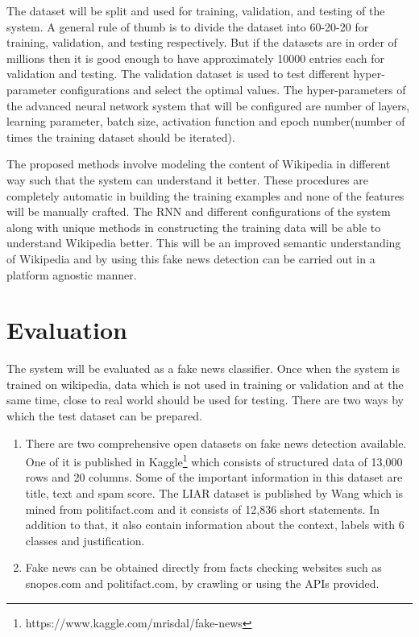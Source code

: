 \documentclass[a4paper, 11pt]{article}
\begin{document}
The dataset will be split and used for training, validation, and testing of the system. A general rule of thumb is to divide the dataset into 60-20-20 for training, validation, and testing respectively. But if the datasets are in order of millions then it is good enough to have approximately 10000 entries each for validation and testing. The validation dataset is used to test different hyper-parameter configurations and select the optimal values. The hyper-parameters of the advanced neural network system that will be configured are number of layers, learning parameter, batch size, activation function and epoch number(number of times the training dataset should be iterated).


The proposed methods involve modeling the content of Wikipedia in different way such  that the system can understand it better. These procedures are completely automatic in building the training examples and none of the features will be manually crafted. The RNN and different configurations of the system along with unique methods in constructing the training data will be able to understand Wikipedia better. This will be an improved semantic understanding of Wikipedia and by using this fake news detection can be carried out in a platform agnostic manner. 

\section{Evaluation}

The system will be evaluated as a fake news classifier. Once when the system is trained on wikipedia, data which is not used in training or validation and at the same time, close to real world should be used for testing. There are two ways by which the test dataset can be prepared.
\begin{enumerate}
\item There are two comprehensive open datasets on fake news detection available. One of it is published in Kaggle\footnote{https://www.kaggle.com/mrisdal/fake-news} which consists of structured data of 13,000 rows and 20 columns. Some of the important information in this dataset are title, text and spam score. The LIAR dataset is published by Wang \cite{Wang2017} which is mined from politifact.com and it consists of 12,836 short statements. In addition to that, it also contain information about the context, labels with 6 classes and justification. 
\item Fake news can be obtained directly from facts checking websites such as snopes.com and politifact.com, by crawling or using the APIs provided.
\end{enumerate}
\end{document}
